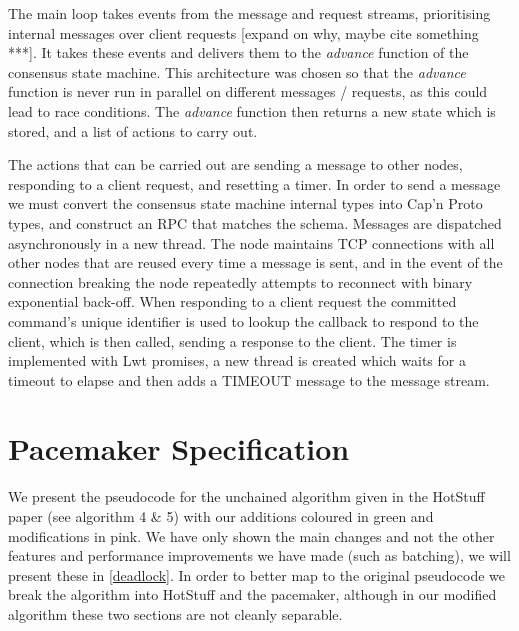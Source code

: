 The main loop takes events from the message and request streams, prioritising internal messages over client requests [expand on why, maybe cite something ***]. It takes these events and delivers them to the \textit{advance} function of the consensus state machine. This architecture was chosen so that the \textit{advance} function is never run in parallel on different messages / requests, as this could lead to race conditions. The \textit{advance} function then returns a new state which is stored, and a list of actions to carry out.

The actions that can be carried out are sending a message to other nodes, responding to a client request, and resetting a timer. In order to send a message we must convert the consensus state machine internal types into Cap'n Proto types, and construct an RPC that matches the schema. Messages are dispatched asynchronously in a new thread. The node maintains TCP connections with all other nodes that are reused every time a message is sent, and in the event of the connection breaking the node repeatedly attempts to reconnect with binary exponential back-off. When responding to a client request the committed command's unique identifier is used to lookup the callback to respond to the client, which is then called, sending a response to the client. The timer is implemented with Lwt promises, a new thread is created which waits for a timeout to elapse and then adds a TIMEOUT message to the message stream.

\section{Pacemaker Specification} \label{spec}
We present the pseudocode for the unchained algorithm given in the HotStuff paper (see algorithm 4 \& 5) with our additions coloured in green and modifications in pink. We have only shown the main changes and not the other features and performance improvements we have made (such as batching), we will present these in \ref{deadlock}. In order to better map to the original pseudocode we break the algorithm into HotStuff and the pacemaker, although in our modified algorithm these two sections are not cleanly separable.

